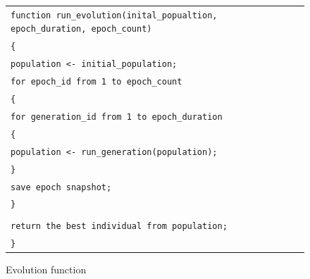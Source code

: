 \documentclass[letterpaper, 16pt]{article}
\newcommand{\tab}{\hspace{6mm}}
\begin{document}
\begin{figure}[H]
    \begin{flushleft}
        \begin{tabular}{l l}
            \texttt{function run\_evolution(inital\_popualtion, epoch\_duration, epoch\_count)} & \\
            \texttt{\{} & \\
            \texttt{\tab population <- initial\_population;} & \\
            \texttt{\tab for epoch\_id from 1 to epoch\_count} & \\
            \texttt{\tab \{} & \\
            \texttt{\tab\tab for generation\_id from 1 to epoch\_duration} & \\
            \texttt{\tab\tab \{} & \\
            \texttt{\tab\tab\tab population <- run\_generation(population);} & \\
            \texttt{\tab\tab \}} & \\
            \texttt{\tab\tab save epoch snapshot;} & \\
            \texttt{\tab \}} & \\
            \texttt{} & \\
            \texttt{\tab return the best individual from population;} & \\
            \texttt{\}} & \\
        \end{tabular}
    \end{flushleft}
    \caption{Evolution function}
    \label{run-evolution}
\end{figure}
\end{document}
